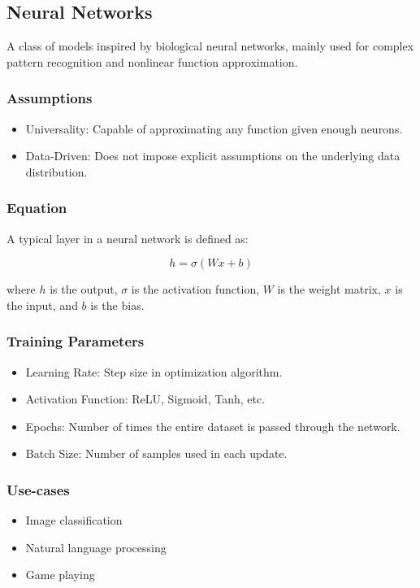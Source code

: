 \documentclass[english]{latex4ei/latex4ei_sheet}
\begin{document}
\begin{sectionbox}
\subsection{Neural Networks}

A class of models inspired by biological neural networks, mainly used for complex pattern recognition and nonlinear function approximation.

\subsubsection{Assumptions}
\begin{itemize}
    \item Universality: Capable of approximating any function given enough neurons.
    \item Data-Driven: Does not impose explicit assumptions on the underlying data distribution.
\end{itemize}

\subsubsection{Equation}
A typical layer in a neural network is defined as:

\[
h = \sigma(Wx + b)
\]

where \( h \) is the output, \( \sigma \) is the activation function, \( W \) is the weight matrix, \( x \) is the input, and \( b \) is the bias.

\subsubsection{Training Parameters}
\begin{itemize}
    \item Learning Rate: Step size in optimization algorithm.
    \item Activation Function: ReLU, Sigmoid, Tanh, etc.
    \item Epochs: Number of times the entire dataset is passed through the network.
    \item Batch Size: Number of samples used in each update.
\end{itemize}

\subsubsection{Use-cases}
\begin{itemize}
    \item Image classification
    \item Natural language processing
    \item Game playing
\end{itemize}


\end{sectionbox}
\end{document}
